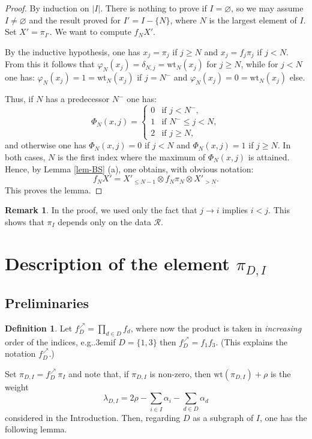 \documentclass[12pt]{amsart}
\numberwithin{equation}{section}
\theoremstyle{definition}
\newtheorem{defin}[thm]{Definition}
\newtheorem{rem}[thm]{Remark}
\def\eg{{e.g.}\kern.3em}
\def\calR{\mathcal{R}} %
\def\wt{\mathrm{wt}}  %
\def\nea{{\scriptscriptstyle\nearrow}}
\begin{document}
\begin{proof} By induction on $\vert I\vert$. There is nothing to prove if $I = \varnothing$, so we may assume 
$I \not= \varnothing$
and the result proved for $I' = I - \{N\}$, where $N$ is the largest element of $I$. 
Set $X' = \pi_{I'}$. We want to compute $f_N X'$. 

\smallskip 
By the inductive hypothesis, one has $x_j = \pi_j$ if $j\geq N$ and $x_j = f_j \pi_j$ if $j < N$. 
From this it follows that $\varphi_N(x_j) = \delta_{N,j} = \wt_N(x_j) $ for $j\geq N$, while for $j < N$ one has: 
$\varphi_N(x_j) = 1 = \wt_N(x_j)$ if $j = N^-$ and $\varphi_N(x_j) = 0 = \wt_N(x_j)$ else. 

Thus, if $N$ has a predecessor $N^-$ one has: 
$$
\Phi_N(x,j) = 
\begin{cases} 
0 & \text{if } j < N^-, 
\\
1 & \text{if } N^- \leq j < N, 
\\
2 & \text{if } j \geq  N,
\end{cases}
$$
and otherwise one has $\Phi_N(x,j) = 0$ if $j < N$ and $\Phi_N(x,j) = 1$ if $j\geq N$. 
In both cases, $N$ is the first index where the maximum of $\Phi_N(x,j)$ is attained. Hence, by Lemma \ref{lem-BS} (a), 
one obtains, with obvious notation: 
$$
f_N X' = X'_{\leq N-1} \otimes f_N \pi_N \otimes X'_{> N}.
$$
This proves the lemma.
\end{proof} 

\begin{rem}\label{rem-prod-R} In the proof, we used only the fact that $j\to i$ implies $i < j$. This shows that 
$\pi_I$ depends only on the data $\calR$. 
\end{rem} 

\section{Description of the element $\pi_{D, I}$} 

\subsection{Preliminaries} 

\begin{defin}\label{def-inc} 
Let $f_D^\nea = \prod_{d\in D} f_d$, where now the product is taken in \emph{increasing} order 
of the indices, \eg if $D = \{1,3\}$ then $f_D^\nea = f_1 f_3$.  (This explains the notation $f_D^\nea$.) 

Set $\pi_{D,I} = f_D^\nea \, \pi _I$ and note that, if $\pi_{D, I}$ is non-zero, then $\wt(\pi_{D,I} ) + \rho$ is the weight 
\begin{equation}
\lambda_{D,I} =  2\rho - \sum_{i\in I} \alpha_i - \sum_{d\in D} \alpha_d 
\end{equation} 
considered in the Introduction. Then, regarding $D$ as a subgraph of $I$, one has the following lemma. 
\end{defin} 
\end{document}
